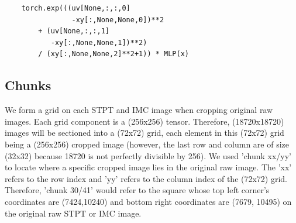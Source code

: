 \documentclass[10pt,twocolumn,letterpaper]{article}
\begin{document}
\begin{verbatim}
	torch.exp(((uv[None,:,:,0]
	            -xy[:,None,None,0])**2
	    + (uv[None,:,:,1]
	       -xy[:,None,None,1])**2)
	    / (xy[:,None,None,2]**2+1)) * MLP(x)
\end{verbatim}

\subsection{Chunks}
We form a grid on each STPT and IMC image when cropping original raw images. Each grid component is a (256x256) tensor. Therefore, (18720x18720) images will be sectioned into a (72x72) grid, each element in this (72x72) grid being a (256x256) cropped image (however, the last row and column are of size (32x32) because 18720 is not perfectly divisible by 256). We used 'chunk xx/yy' to locate where a specific cropped image lies in the original raw image. The 'xx' refers to the row index and 'yy' refers to the column index of the (72x72) grid. Therefore, 'chunk 30/41' would refer to the square whose top left corner's coordinates are (7424,10240) and bottom right coordinates are (7679, 10495) on the original raw STPT or IMC image.



{\small


}
\end{document}
